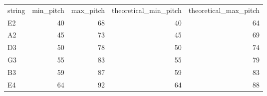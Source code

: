 \begin{tabular}{lrrrr}
string & min_pitch & max_pitch & theoretical_min_pitch & theoretical_max_pitch \\
E2 & 40 & 68 & 40 & 64 \\
A2 & 45 & 73 & 45 & 69 \\
D3 & 50 & 78 & 50 & 74 \\
G3 & 55 & 83 & 55 & 79 \\
B3 & 59 & 87 & 59 & 83 \\
E4 & 64 & 92 & 64 & 88 \\
\end{tabular}
